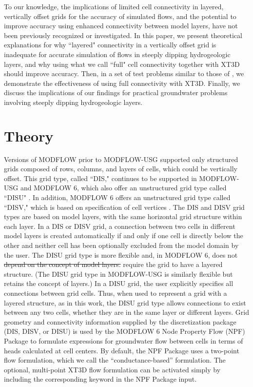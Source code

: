 \documentclass{article}
\begin{document}
To our knowledge, the implications of limited cell connectivity in layered, vertically offset grids for the accuracy of simulated flows, and the potential to improve accuracy using enhanced connectivity between model layers, have not been previously recognized or investigated. In this paper, we present theoretical explanations for why ``layered" connectivity in a vertically offset grid is inadequate for accurate simulation of flows in steeply dipping hydrogeologic layers, and why using what we call ``full" cell connectivity together with XT3D should improve accuracy. Then, in a set of test problems similar to those of \cite{bardot2023}, we demonstrate the effectiveness of using full connectivity with XT3D. Finally, we discuss the implications of our findings for practical groundwater problems involving steeply dipping hydrogeologic layers.

\section*{Theory}

Versions of MODFLOW prior to MODFLOW-USG \citep{modflowusg} supported only structured grids composed of rows, columns, and layers of cells, which could be vertically offset. This grid type, called ``DIS," continues to be supported in MODFLOW-USG and MODFLOW 6, which also offer an unstructured grid type called ``DISU" \citep{modflowusg, modflow6gwf}. In addition, MODFLOW 6 offers an  unstructured grid type called ``DISV," which is based on specification of cell vertices \citep{modflow6gwf}. The DIS and DISV grid types are based on model layers, with the same horizontal grid structure within each layer. {\color{red} In a DIS or DISV grid, a connection between two cells in different model layers is created automatically if and only if one cell is directly below the other and neither cell has been optionally excluded from the model domain by the user.} The DISU grid type is more flexible and{\color{red}, in MODFLOW 6,} does not {\color{red} \sout{depend on the concept of model layers.}}{\color{red} require the grid to have a layered structure. (The DISU grid type in MODFLOW-USG is similarly flexible but retains the concept of layers.) In a DISU grid, the user explicitly specifies all connections between grid cells. Thus, when used to represent a grid with a layered structure, as in this work, the DISU grid type allows connections to exist between any two cells, whether they are in the same layer or different layers. Grid geometry and connectivity information supplied by the discretization package (DIS, DISV, or DISU) is used by the MODFLOW 6 Node Property Flow (NPF) Package to formulate expressions for groundwater flow between cells in terms of heads calculated at cell centers. By default, the NPF Package uses a two-point flow formulation, which we call the ``conductance-based'' formulation. The optional, multi-point XT3D flow formulation can be activated simply by including the corresponding keyword in the NPF Package input.}
\end{document}

